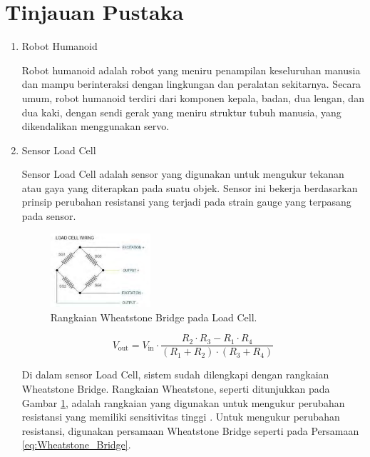 \section{Tinjauan Pustaka}
\label{sec:tinjauanpustaka}

\begin{enumerate}[label=\Alph*.]
    \item Robot Humanoid
    \label{subsec:robothumanoid}

    \hspace*{1em} Robot humanoid adalah robot yang meniru penampilan keseluruhan manusia dan mampu berinteraksi dengan lingkungan dan peralatan sekitarnya. Secara umum, robot humanoid terdiri dari komponen kepala, badan, dua lengan, dan dua kaki, dengan sendi gerak yang meniru struktur tubuh manusia, yang dikendalikan menggunakan servo.

    \item Sensor Load Cell
    \label{subsec:sensorloadcell}

    \hspace*{1em} Sensor Load Cell adalah sensor yang digunakan untuk mengukur tekanan atau gaya yang diterapkan pada suatu objek. Sensor ini bekerja berdasarkan prinsip perubahan resistansi yang terjadi pada strain gauge yang terpasang pada sensor.

    \begin{figure}[h]
        \centering
        \includegraphics[width=0.35\textwidth]{./gambar/wheatstone_loadcell.png}
        \caption{Rangkaian Wheatstone Bridge pada Load Cell\cite{rahman2018autonomous}.}
        \label{fig:Wheatstone_Bridge}
    \end{figure}
    
    \begin{equation}
      V_{\mathrm{out}} = V_{\mathrm{in}} \cdot \frac{R_2 \cdot R_3 - R_1 \cdot R_4}{(R_1 + R_2) \cdot (R_3 + R_4)}
      \label{eq:Wheatstone_Bridge}
    \end{equation}
    
    \hspace*{1em} Di dalam sensor Load Cell, sistem sudah dilengkapi dengan rangkaian Wheatstone Bridge. Rangkaian Wheatstone, seperti ditunjukkan pada Gambar \ref{fig:Wheatstone_Bridge}, adalah rangkaian yang digunakan untuk mengukur perubahan resistansi yang memiliki sensitivitas tinggi \cite{rahman2018autonomous}. Untuk mengukur perubahan resistansi, digunakan persamaan Wheatstone Bridge seperti pada Persamaan \ref{eq:Wheatstone_Bridge}. 


\end{enumerate}
